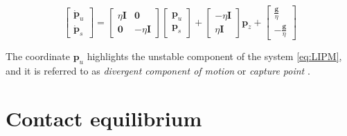 \begin{equation*}
    \begin{bmatrix}
        \dot{\bm{p}}_u \\ \dot{\bm{p}}_s
    \end{bmatrix}
    =
    \begin{bmatrix}
        \eta\bm{I} &  \bm{0} \\
        \bm{0} & -\eta\bm{I}
    \end{bmatrix}
    \begin{bmatrix}
        \bm{p}_u \\ \bm{p}_s
    \end{bmatrix}
    +
    \begin{bmatrix}
        -\eta \bm{I} \\ \eta \bm{I}
    \end{bmatrix}
    \bm{p}_z 
    +
    \begin{bmatrix}
        \frac{\bm{g}}{\eta} \\ -\frac{\bm{g}}{\eta}
    \end{bmatrix}
\end{equation*}

The coordinate $\bm{p}_u$ highlights the unstable component of the system
\eqref{eq:LIPM}, and it is referred to as \textit{divergent component of motion}
\cite{Englsberger2015TRO} or \textit{capture point}
\cite{Pratt2006CapturePoint}.

\section{Contact equilibrium}
\label{sec:contact-equilibrium}
%
%

